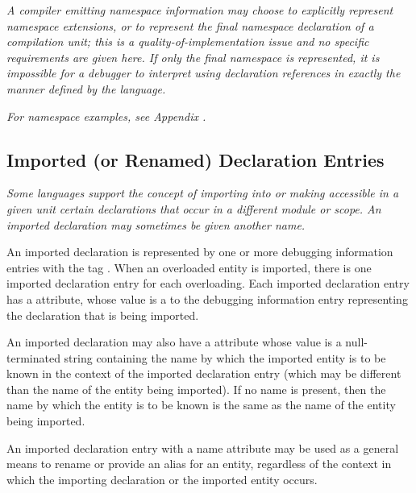 \textit{A compiler emitting namespace information may choose to
explicitly represent namespace extensions, or to represent the
final namespace declaration of a compilation unit; this is a
quality-of-implementation issue and no specific requirements
are given here. If only the final namespace is represented,
it is impossible for a debugger to interpret using declaration
references in exactly the manner defined by the 
 language.}

\textit{For  namespace examples, 
see Appendix .}


\subsection{Imported (or Renamed) Declaration Entries} 
\label{chap:importedorrenameddeclarationentries}

\textit{Some languages support the concept of importing into or 
making accessible in a given unit certain declarations that occur
in a different module or scope. An imported declaration may 
sometimes be given another name.}

An imported declaration is represented by one or
more debugging information entries with the 
tag \DWTAGimporteddeclarationTARG. 
When\hypertarget{chap:DWATimportimporteddeclaration}{}
an overloaded entity is imported, there is one imported 
declaration entry for each overloading. 
Each imported declaration entry has a
\DWATimportDEFN{} attribute,
whose value is a  to the
debugging information entry representing the declaration that
is being imported.

An imported declaration may also have a \DWATname{}
attribute
whose value is a null-terminated string containing the
name by which the
imported entity is to be known in the context of the imported
declaration entry (which may be different than the name of
the entity being imported). If no name is present, then the
name by which the entity is to be known is the same as the
name of the entity being imported.

An imported declaration entry with a name attribute may be
used as a general means to rename or provide an alias for
an entity, regardless of the context in which the importing
declaration or the imported entity occurs.

